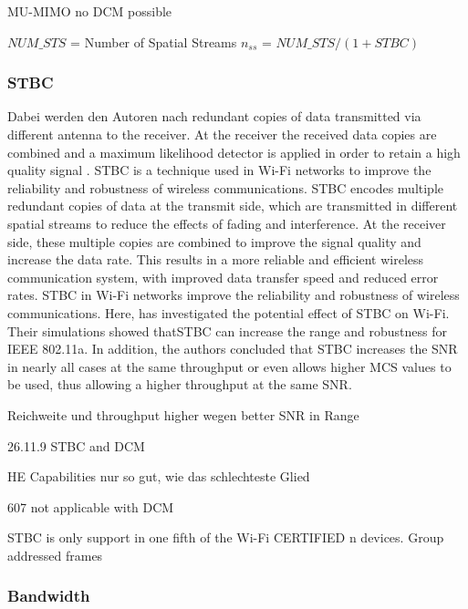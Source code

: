 MU-\ac{MIMO} no DCM possible

$NUM\_STS$ = Number of Spatial Streams
$n_{ss}$ = $NUM\_STS / (1 + STBC)$
\subsubsection*{\ac{STBC}}
Dabei werden den Autoren nach redundant copies of data transmitted via different antenna to the receiver. At the receiver the received data copies are combined and a maximum likelihood detector is applied in order to retain a high quality signal \cite{Santumon}.
\ac{STBC} is a technique used in Wi-Fi networks to improve the reliability and robustness of wireless communications. \ac{STBC} encodes multiple redundant copies of data at the transmit side, which are transmitted in different spatial streams to reduce the effects of fading and interference. At the receiver side, these multiple copies are combined to improve the signal quality and increase the data rate. This results in a more reliable and efficient wireless communication system, with improved data transfer speed and reduced error rates.
\ac{STBC} in Wi-Fi networks improve the reliability and robustness of wireless communications.
Here, \textcite{Stamoulis} has investigated the potential effect of \ac{STBC} on Wi-Fi. Their simulations showed that\ac{STBC} can increase the range and robustness for IEEE 802.11a. In addition, the authors concluded  that \ac{STBC} increases the \ac{SNR} in nearly all cases at the same throughput or even allows higher \ac{MCS} values to be used, thus allowing a higher throughput at the same \ac{SNR}. 


\cite{sauter} Reichweite und throughput higher wegen better SNR in Range 


26.11.9 STBC and DCM

HE Capabilities nur so gut, wie das schlechteste Glied

\cite{Standard} 607 not applicable with DCM

\cite{MAtthew gast 11n} \ac{STBC} is only support in one fifth of the Wi-Fi CERTIFIED n devices.
Group addressed frames
\subsubsection*{Bandwidth}